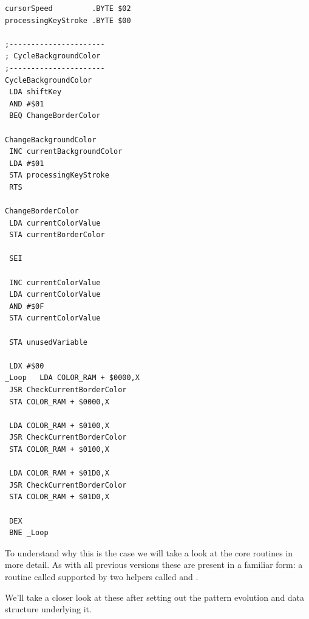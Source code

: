 \begin{minipage}[b]{0.33\linewidth}
\begin{lrbox}{\mybox}
\begin{lstlisting}[basicstyle=\ttfamily\tiny]
cursorSpeed         .BYTE $02
processingKeyStroke .BYTE $00

;----------------------
; CycleBackgroundColor   
;----------------------
CycleBackgroundColor   
 LDA shiftKey 
 AND #$01
 BEQ ChangeBorderColor

ChangeBackgroundColor
 INC currentBackgroundColor
 LDA #$01
 STA processingKeyStroke 
 RTS 

ChangeBorderColor
 LDA currentColorValue
 STA currentBorderColor

 SEI 

 INC currentColorValue
 LDA currentColorValue
 AND #$0F
 STA currentColorValue

 STA unusedVariable

 LDX #$00
_Loop   LDA COLOR_RAM + $0000,X
 JSR CheckCurrentBorderColor
 STA COLOR_RAM + $0000,X

 LDA COLOR_RAM + $0100,X
 JSR CheckCurrentBorderColor
 STA COLOR_RAM + $0100,X

 LDA COLOR_RAM + $01D0,X
 JSR CheckCurrentBorderColor
 STA COLOR_RAM + $01D0,X

 DEX 
 BNE _Loop
\end{lstlisting}
\end{lrbox}%
\scalebox{0.8}{\usebox{\mybox}}
\end{minipage}
\clearpage
To understand why this is the case we will take a look at the core routines in more detail. As with all previous versions these are present
in a familiar form: a routine called  supported by two helpers called 
and .

We'll take a closer look at these after setting out the pattern evolution and data structure underlying it.

